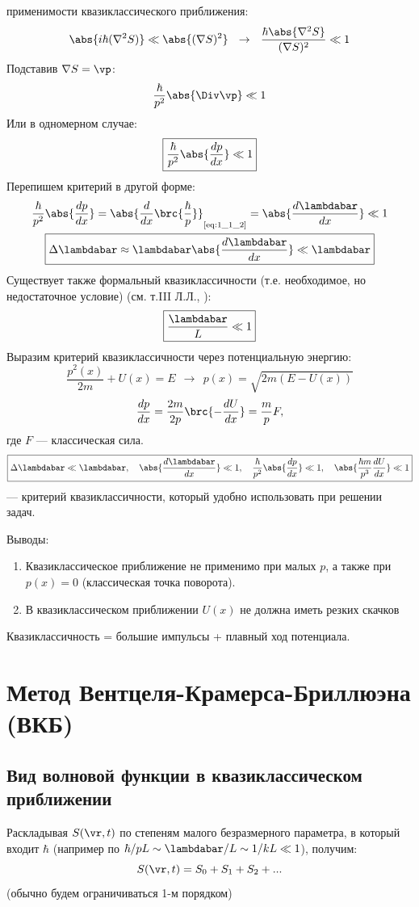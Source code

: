  применимости квазиклассического приближения:
$$
\abs{i\hbar(\nabla^2 S)} \ll \abs{(\nabla S)^2} ~~\rightarrow~~ \frac{\hbar \abs{\nabla^2 S}}{(\nabla S)^2} \ll 1
$$
Подставив $\nabla S =\vp$:
$$
\frac{\hbar}{p^2}\abs{\Div \vp} \ll 1
$$
Или в одномерном случае:
$$
\boxed{\frac{\hbar}{p^2}\abs{\frac{dp}{dx}} \ll 1}
$$
Перепишем критерий в другой форме:
$$
\begin{gathered}
\frac{\hbar}{p^2} \abs{\frac{dp}{dx}} = 
\abs{\frac{d}{dx}\brc{\frac{\hbar}{p}}} _{\text{\eqref{eq:1_1_2}}} = \abs{\frac{d\lambdabar}{dx}} \ll 1\\
\boxed{\Delta \lambdabar \approx \lambdabar \abs{\frac{d\lambdabar}{dx}} \ll \lambdabar}
\end{gathered}
$$
Существует также формальный  квазиклассичности (т.е. необходимое, но недостаточное условие) (см. т.III Л.Л., ):
$$
\boxed{\frac{\lambdabar}{L} \ll 1}
$$
Выразим критерий квазиклассичности через потенциальную энергию:
$$
\frac{p^2(x)}{2m} + U(x) = E ~~\rightarrow~~ p(x)=\sqrt{2m(E-U(x))}
$$
$$
\frac{dp}{dx}=\frac{2m}{2p}\brc{-\frac{dU}{dx}} = \frac{m}{p}F,
$$
где $F$ --- классическая сила.
$$
\boxed{\Delta \lambdabar \ll \lambdabar,~~~\abs{\frac{d\lambdabar}{dx}} \ll 1,~~~\frac{\hbar}{p^2} \abs{\frac{dp}{dx}} \ll 1, ~~~\abs{\frac{\hbar m}{p^3} \frac{dU}{dx}} \ll 1 }
$$
--- критерий квазиклассичности, который удобно использовать при решении задач.

Выводы:
\begin{enumerate}
\item Квазиклассическое приближение не применимо при малых $p$, а также при $p(x)=0$ (классическая точка поворота).
\item В квазиклассическом приближении $U(x)$ не должна иметь резких скачков 
\end{enumerate}

Квазиклассичность = большие импульсы + плавный ход потенциала.

\section{Метод Вентцеля-Крамерса-Бриллюэна (ВКБ)}
\subsection{Вид волновой функции в квазиклассическом приближении}

Раскладывая $S(\vr,t)$ по степеням малого безразмерного параметра, в который входит $\hbar$ (например по $\hbar/pL \sim \lambdabar/L \sim 1/kL \ll 1$), получим:
$$
S(\vr,t)=S_0 + S_1 + S_2 + ...
$$
(обычно будем ограничиваться 1-м порядком)


